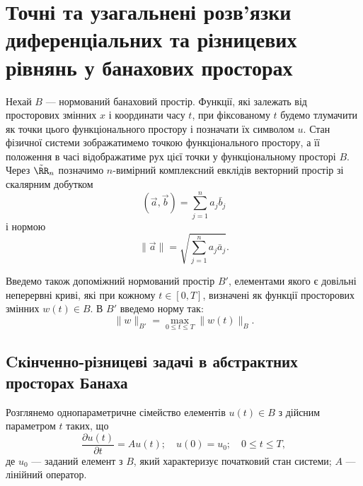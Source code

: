 \section{Точні та узагальнені розв'язки диференціальних та різницевих рівнянь у банахових просторах}


Нехай $B$ --- нормований банаховий простір. Функції, які залежать від просторових змінних $x$ і координати часу $t$, при фіксованому $t$ будемо тлумачити як точки цього функціонального простору і позначати їх символом $u$. Стан фізичної системи зображатимемо точкою функціонального простору, а її положення в часі відображатиме рух цієї точки у функціональному просторі $B$. Через $\tilde{\RR}_n$  позначимо $n$-вимірний комплексний евклідів векторний простір зі скалярним добутком
\begin{equation*}
    \left(\vec a, \vec b\right) = \sum_{j = 1}^n a_j \bar b_j
\end{equation*}
і нормою
\begin{equation*}
    \|\vec a\| = \sqrt{\sum_{j = 1}^n a_j \bar a_j}.
\end{equation*}

Введемо також допоміжний нормований простір $B'$, елементами якого є довільні неперервні криві, які при кожному $t \in [0, T]$, визначені як функції просторових змінних $w(t) \in B$. В $B'$ введемо норму так:
\begin{equation*}
    \|w\|_{B'} = \max_{0 \le t \le T} \|w(t)\|_B.
\end{equation*}

\subsection{Cкінченно-різницеві задачі в абстрактних просторах Банаха}

Розглянемо однопараметричне сімейство елементів $u(t) \in B$ з дійсним параметром $t$ таких, що 
\begin{equation}
    \label{eq:3.1}
    \frac{\partial u(t)}{\partial t} = A u(t); \quad u(0) = u_0; \quad 0 \le t \le T,
\end{equation}
де $u_0$ --- заданий елемент з $B$, який характеризує початковий стан системи; $A$ --- лінійний оператор. \medskip

